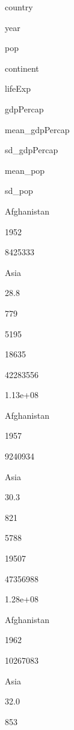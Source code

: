 \documentclass[]{book}
\newenvironment{Shaded}{\begin{snugshade}}{\end{snugshade}}
\newcommand{\DataTypeTok}[1]{\textcolor[rgb]{0.13,0.29,0.53}{#1}}
\newcommand{\KeywordTok}[1]{\textcolor[rgb]{0.13,0.29,0.53}{\textbf{#1}}}
\newcommand{\NormalTok}[1]{#1}
\newcommand{\OperatorTok}[1]{\textcolor[rgb]{0.81,0.36,0.00}{\textbf{#1}}}
\newcommand{\StringTok}[1]{\textcolor[rgb]{0.31,0.60,0.02}{#1}}
\begin{document}
\begin{Shaded}
\end{Shaded}

country

year

pop

continent

lifeExp

gdpPercap

mean\_gdpPercap

sd\_gdpPercap

mean\_pop

sd\_pop

Afghanistan

1952

8425333

Asia

28.8

779

5195

18635

42283556

1.13e+08

Afghanistan

1957

9240934

Asia

30.3

821

5788

19507

47356988

1.28e+08

Afghanistan

1962

10267083

Asia

32.0

853
\end{document}
